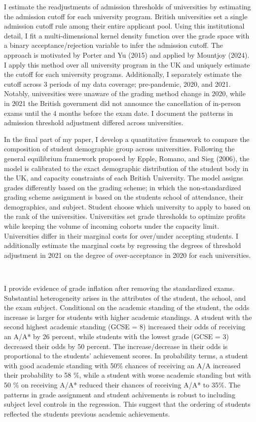 I estimate the readjustments of admission thresholds of universities by estimating the admission cutoff for each university program. British universities set a single admission cutoff rule among their entire applicant pool. Using this institutional detail, I fit a multi-dimensional kernel density function over the grade space with a binary acceptance/rejection variable to infer the admission cutoff. The approach is motivated by Porter and Yu (2015) and applied by Mountjoy (2024). I apply this method over all university program in the UK and uniquely estimate the cutoff for each university programs. Additionally, I separately estimate the cutoff across 3 periods of my data coverage; pre-pandemic, 2020, and 2021. Notably, universities were unaware of the grading method change in 2020, while in 2021 the British government did not announce the cancellation of in-person exams until the 4 months before the exam date. I document the patterns in admission threshold adjustment differed across universities. 

In the final part of my paper, I develop a quantitative framework to compare the composition of student demographic group across universities. Following the general equilibrium framework proposed by Epple, Romano, and Sieg (2006), the model is calibrated to the exact demographic distribution of the student body in the UK, and capacity constraints of each British University. The model assigns grades differently based on the grading scheme; in which the non-standardized grading scheme assignment is based on the students school of attendance, their demographics, and subject. Student choose which university to apply to based on the rank of the universities. Universities set grade thresholds to optimize profits while keeping the volume of incoming cohorts under the capacity limit. Universities differ in their marginal costs for over/under accepting students. I additionally estimate the marginal costs by regressing the degrees of threshold adjustment in 2021 on the degree of over-acceptance in 2020 for each universities. 

\

I provide evidence of grade inflation after removing the standardized exams. Substantial heterogeneity arises in the attributes of the student, the school, and the exam subject. Conditional on the academic standing of the student, the odds increase is larger for students with higher academic standings. A student with the second highest academic standing (GCSE = 8) increased their odds of receiving an A/A* by 26 percent, while students with the lowest grade (GCSE = 3) decreased their odds by 50 percent. The increase/decrease in their odds is proportional to the students' achievement scores. In probability terms, a student with good academic standing with 50\% chances of receiving an A/A increased their probability to 58 \%, while a student with worse academic standing but with 50 \% on receiving A/A* reduced their chances of receiving A/A* to 35\%. The patterns in grade assignment and student achivements is robust to including subject level controls in the regression. This suggest that the ordering of students reflected the students previous academic achievements.


